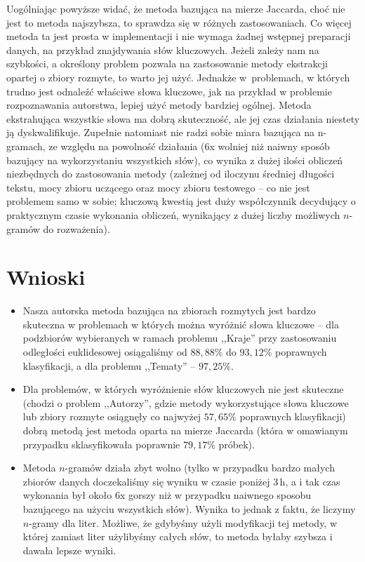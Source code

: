 \documentclass[a4paper]{classrep}
\begin{document}
Uogólniając powyższe widać, że metoda bazująca na mierze Jaccarda, choć nie jest to metoda najszybsza, to sprawdza się w różnych zastosowaniach. Co więcej metoda ta jest
prosta w implementacji i nie wymaga żadnej wstępnej preparacji danych, na przykład znajdywania słów kluczowych. Jeżeli zależy nam na szybkości, a określony problem pozwala
na zastosowanie metody ekstrakcji opartej o zbiory rozmyte, to warto jej użyć. Jednakże w~problemach, w których trudno jest odnaleźć właściwe słowa kluczowe, jak na przykład
w problemie rozpoznawania autorstwa, lepiej użyć metody bardziej ogólnej. Metoda ekstrahująca wszystkie słowa ma dobrą skuteczność, ale jej czas działania  niestety ją dyskwalifikuje.
Zupełnie natomiast nie radzi sobie miara bazująca na n-gramach, ze względu na powolność działania (\(6\)x wolniej niż naiwny sposób bazujący na wykorzystaniu wszystkich słów), co wynika z dużej ilości obliczeń niezbędnych do zastosowania metody (zależnej od iloczynu średniej długości tekstu, mocy zbioru uczącego oraz mocy zbioru testowego -- co nie jest problemem samo w sobie; kluczową kwestią jest duży współczynnik decydujący o praktycznym czasie wykonania obliczeń, wynikający z dużej liczby możliwych $n$-gramów do rozważenia). 
\section{Wnioski}
\begin{itemize}
\item Nasza autorska metoda bazująca na zbiorach rozmytych jest bardzo skuteczna w problemach w których można wyróżnić słowa kluczowe -- dla podzbiorów wybieranych w ramach problemu ,,Kraje'' przy zastosowaniu odległości euklidesowej osiągaliśmy od \(88,88\%\) do \(93,12\%\) poprawnych klasyfikacji, a dla problemu ,,Tematy'' -- \(97,25\%\).
\item Dla problemów, w których wyróżnienie słów kluczowych nie jest skuteczne (chodzi o problem ,,Autorzy'', gdzie metody wykorzystujące słowa kluczowe lub zbiory rozmyte osiągnęły co najwyżej \(57,65\%\) poprawnych klasyfikacji) dobrą metodą jest metoda oparta na mierze Jaccarda (która w omawianym przypadku sklasyfikowała poprawnie \(79,17\%\) próbek).
\item Metoda \(n\)-gramów działa zbyt wolno (tylko w przypadku bardzo małych zbiorów danych doczekaliśmy się wyniku w czasie poniżej \(3\,\mbox{h}\), a i tak czas wykonania był około \(6\)x gorszy niż w przypadku naiwnego sposobu bazującego na użyciu wszystkich słów). Wynika to jednak z faktu, że liczymy \(n\)-gramy dla liter. Możliwe, że gdybyśmy użyli modyfikacji tej metody, w której zamiast
liter użylibyśmy całych słów, to metoda byłaby szybsza i dawała lepsze wyniki.
\end{itemize}
\end{document}
